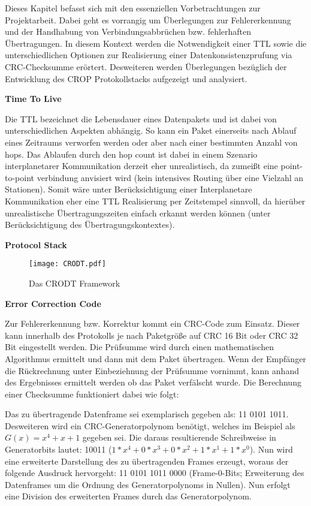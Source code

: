 
Dieses Kapitel befasst sich mit den essenziellen Vorbetrachtungen zur
Projektarbeit. Dabei geht es vorrangig um {\"U}berlegungen zur Fehlererkennung
und der Handhabung von Verbindungsabbr{\"u}chen bzw. fehlerhaften
{\"U}bertragungen. In diesem Kontext werden die Notwendigkeit einer TTL sowie
die unterschiedlichen Optionen zur Realisierung einer Datenkonsistenzpr{u}fung
via CRC-Checksumme er{\"o}rtert. Desweiteren werden {\"U}berlegungen
bez{\"u}glich der Entwicklung des CROP Protokollstacks aufgezeigt und analysiert.

\textbf{Time To Live}

Die TTL bezeichnet die Lebensdauer eines Datenpakets und ist dabei von
unterschiedlichen Aspekten abh{\"a}ngig. So kann ein Paket einerseits nach
Ablauf eines Zeitraums verworfen werden oder aber nach einer bestimmten Anzahl
von hops. Das Ablaufen durch den hop count ist dabei in einem Szenario
interplanetarer Kommunikation derzeit eher unrealistisch, da zumei{\ss}t eine
point-to-point verbindung anvisiert wird (kein intensives Routing {\"u}ber eine
Vielzahl an Stationen). Somit w{\"a}re unter Ber{\"u}cksichtigung einer
Interplanetare Kommunikation eher eine TTL Realisierung per Zeitstempel
sinnvoll, da hier{\"u}ber unrealistische {\"U}bertragungszeiten einfach erkannt
werden k{\"o}nnen (unter Ber{\"u}cksichtigung des {\"U}bertragungskontextes).

\textbf{Protocol Stack}

\begin{figure}[H]
\centering
\texttt{[image: CRODT.pdf]}
\caption{Das CRODT Framework}
\label{fig:CRODT}
\end{figure}

\textbf{Error Correction Code}

Zur Fehlererkennung bzw. Korrektur kommt ein CRC-Code zum Einsatz. Dieser kann
innerhalb des Protokolls je nach Paketgr{\"o}{\ss}e auf CRC 16 Bit oder CRC 32
Bit eingestellt werden. Die Pr{\"u}fsumme wird durch einen mathematischen
Algorithmus ermittelt und dann mit dem Paket {\"u}bertragen. Wenn der
Empf{\"a}nger die R{\"u}ckrechnung unter Einbeziehnung der Pr{\"u}fsumme
vornimmt, kann anhand des Ergebnisses ermittelt werden ob das Paket
verf{\"a}lscht wurde. Die Berechnung einer Checksumme funktioniert dabei wie
folgt:

Das zu {\"u}bertragende Datenframe sei exemplarisch gegeben als: 11 0101 1011.
Desweiteren wird ein CRC-Generatorpolynom ben{\"o}tigt, welches im Beispiel als
$G(x) = x^4 + x + 1$ gegeben sei. Die daraus resultierende Schreibweise in Generatorbits lautet: 10011
($1*x^4+0*x^3+0*x^2+1*x^1+1*x^0$).
Nun wird eine erweiterte Darstellung des zu {\"u}bertragenden Frames erzeugt,
woraus der folgende Ausdruck hervorgeht: 11 0101 1011 0000
(Frame-0-Bits; Erweiterung des Datenframes um die Ordnung des Generatorpolynoms in Nullen). Nun erfolgt eine
Division des erweiterten Frames durch das Generatorpolynom.

